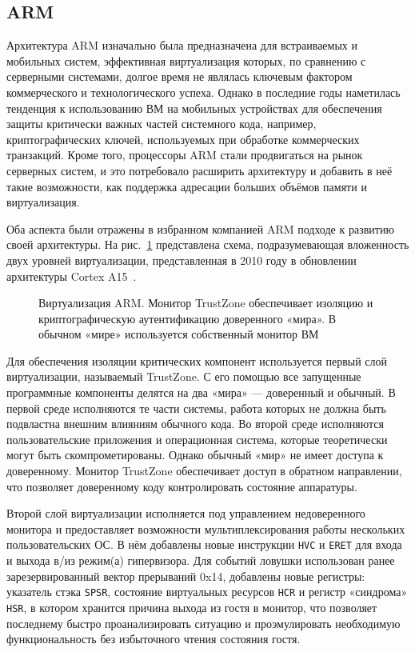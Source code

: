 \subsection{ARM}

Архитектура ARM изначально была предназначена для встраиваемых и мобильных систем, эффективная виртуализация которых, по сравнению с серверными системами, долгое время не являлась ключевым фактором коммерческого и технологического успеха. Однако в последние годы наметилась тенденция к использованию ВМ на мобильных устройствах для обеспечения защиты критически важных частей системного кода, например, криптографических ключей, используемых при обработке коммерческих транзакций. Кроме того, процессоры ARM стали продвигаться на рынок серверных систем, и это потребовало расширить архитектуру и добавить в неё такие возможности, как поддержка адресации больших объёмов памяти и виртуализация.

Оба аспекта были отражены в избранном компанией ARM подходе к развитию своей архитектуры. На рис.~\ref{fig:arm-vt-trustzone} представлена схема, подразумевающая вложенность двух уровней виртуализации, представленная в 2010 году в обновлении архитектуры Cortex A15~\cite{arm-a15}. 

\begin{figure}[htb]
    \centering
    \caption[Виртуализация ARM]{Виртуализация ARM. Монитор TrustZone обеспечивает изоляцию и криптографическую аутентификацию доверенного «мира». В обычном «мире» используется собственный монитор ВМ}
    \label{fig:arm-vt-trustzone}
\end{figure}

Для обеспечения изоляции критических компонент используется первый слой виртуализации, называемый TrustZone. С его помощью все запущенные программные компоненты  делятся на два «мира» --- доверенный и обычный. В первой среде исполняются те части системы, работа которых не должна быть подвластна внешним влияниям обычного кода. Во второй среде исполняются пользовательские приложения и операционная система, которые теоретически могут быть скомпрометированы. Однако обычный «мир» не имеет доступа к доверенному. Монитор TrustZone обеспечивает доступ в обратном направлении, что позволяет доверенному коду контролировать состояние аппаратуры.

Второй слой виртуализации исполняется под управлением недоверенного монитора и предоставляет возможности мультиплексирования работы нескольких пользовательских ОС. В нём добавлены новые инструкции \texttt{HVC} и \texttt{ERET} для входа и выхода в/из режим(а) гипервизора. Для событий ловушки использован ранее зарезервированный вектор прерываний 0x14, добавлены новые регистры: указатель стэка \texttt{SPSR}, состояние виртуальных ресурсов \texttt{HCR} и регистр «синдрома» \texttt{HSR}, в котором хранится причина выхода из гостя  в монитор, что позволяет последнему быстро проанализировать ситуацию и проэмулировать необходимую функциональность без избыточного чтения состояния гостя.

